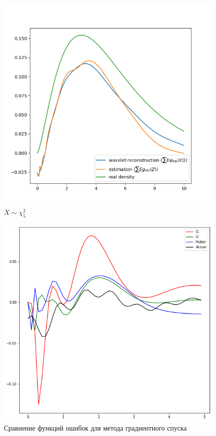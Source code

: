 \documentclass[12pt, a4paper]{report}
\begin{document}
\begin{figure}[h]
    \caption{$X \sim \chi^2_5$}
    \centering
    \includegraphics[width=\textwidth]{chisq}
\end{figure}

\begin{figure}[h]
  \caption{Сравнение функций ошибок для метода градиентного спуска}
  \centering
  \includegraphics[width=\textwidth]{comp-loss}
\end{figure}
\end{document}
